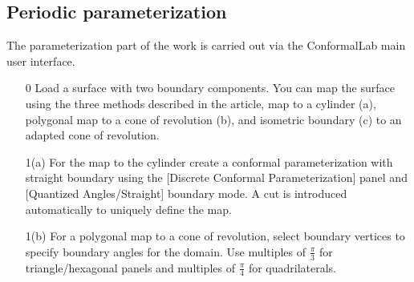 \documentclass[Thesis.tex]{subfiles}
\begin{document}
\subsection{Periodic parameterization}
The parameterization part of the work is carried out via the {\sc ConformalLab} main user interface. 

\begin{itemize}
\item[0] Load a surface with two boundary components. You can map the surface using the three methods described in the article, map to a cylinder (a), polygonal map to a cone of revolution (b), and isometric boundary (c) to an adapted cone of revolution.
\item[1(a)] For the map to the cylinder create a conformal parameterization with straight boundary using the [Discrete Conformal Parameterization] panel and [Quantized Angles/Straight] boundary mode. A cut is introduced automatically to uniquely define the map.\\

\begin{center}
\begin{minipage}{0.9\linewidth}
            \centering
            \label{fig:periodic_algorithm1a}
\end{minipage}
\end{center}            

\item[1(b)] For a polygonal map to a cone of revolution, select boundary vertices to specify boundary angles for the domain. Use multiples of $\frac{\pi}{3}$ for triangle/hexagonal panels and multiples of $\frac{\pi}{4}$ for quadrilaterals.


\end{itemize}
\end{document}
